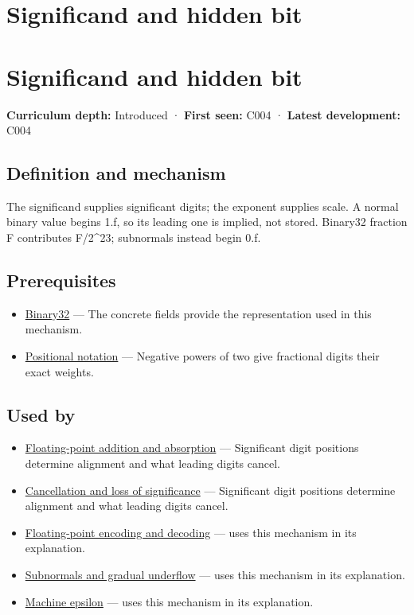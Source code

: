 \hypertarget{appendix-a24fd710cf67}{}
\section*{Significand and hidden bit}
\section{Significand and hidden bit}\label{appendix-a24fd710cf67-significand-and-hidden-bit}

\textbf{Curriculum depth:} Introduced · \textbf{First seen:} C004 · \textbf{Latest development:} C004

\subsection{Definition and mechanism}\label{appendix-a24fd710cf67-definition-and-mechanism}

The significand supplies significant digits; the exponent supplies scale. A normal binary value begins 1.f, so its leading one is implied, not stored. Binary32 fraction F contributes F/2\^{}23; subnormals instead begin 0.f.

\subsection{Prerequisites}\label{appendix-a24fd710cf67-prerequisites}

\begin{itemize}
\tightlist
\item
  \hyperref[appendix-5057f9ad327f]{Binary32} --- The concrete fields provide the representation used in this mechanism.
\item
  \hyperref[appendix-83c3f28f7bda]{Positional notation} --- Negative powers of two give fractional digits their exact weights.
\end{itemize}

\subsection{Used by}\label{appendix-a24fd710cf67-used-by}

\begin{itemize}
\item
  \hyperref[appendix-a1b1b4580dfd]{Floating-point addition and absorption} --- Significant digit positions determine alignment and what leading digits cancel.
\item
  \hyperref[appendix-a2773a6a2f9d]{Cancellation and loss of significance} --- Significant digit positions determine alignment and what leading digits cancel.
\item
  \hyperref[appendix-6854d0e2218e]{Floating-point encoding and decoding} --- uses this mechanism in its explanation.
\item
  \hyperref[appendix-00a6e044c437]{Subnormals and gradual underflow} --- uses this mechanism in its explanation.
\item
  \hyperref[appendix-390ea641da54]{Machine epsilon} --- uses this mechanism in its explanation.
\end{itemize}

